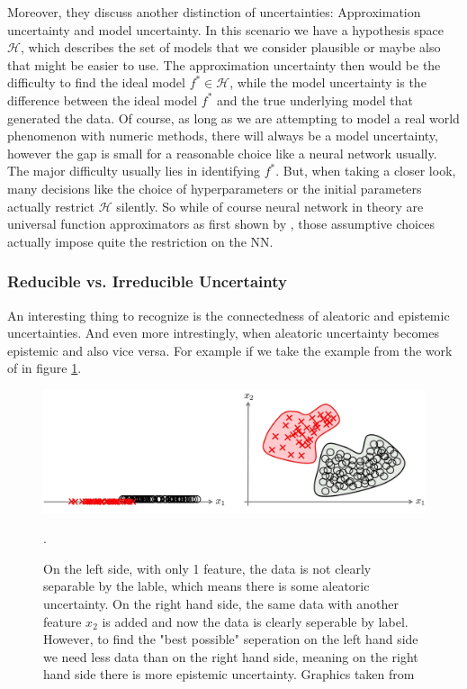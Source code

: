 \documentclass{article}
\begin{document}
Moreover, they discuss another distinction of uncertainties: Approximation uncertainty and model uncertainty. In this scenario we have a hypothesis space $\mathcal{H}$, which describes the set of models that we consider plausible or maybe also that might be easier to use. The approximation uncertainty then would be the difficulty to find the ideal model $f^* \in \mathcal{H}$, while the model uncertainty is the difference between the ideal model $f^*$ and the true underlying model that generated the data. Of course, as long as we are attempting to model a real world phenomenon with numeric methods, there will always be a model uncertainty, however the gap is small for a reasonable choice like a neural network usually. The major difficulty usually lies in identifying $f^*$. But, when taking a closer look, many decisions like the choice of hyperparameters or the initial parameters actually restrict $\mathcal{H}$ silently. So while of course neural network in theory are universal function approximators as first shown by \cite{HORNIK1989359}, those assumptive choices actually impose quite the restriction on the NN.

\subsubsection{Reducible vs. Irreducible Uncertainty}
An interesting thing to recognize is the connectedness of aleatoric and epistemic uncertainties. And even more intrestingly, when aleatoric uncertainty becomes epistemic and also vice versa. For example if we take the example from the work of \cite{hullermeier_aleatoric_2021} in figure \ref{fig:reducible_vs_irreducible}.

\begin{figure}[htbp]
  \centering
  \includegraphics[width=\textwidth]{resources/reducible_vs_irreducible.jpg}
  \caption[More features separate labels]{On the left side, with only 1 feature, the data is not clearly separable by the lable, which means there is some aleatoric uncertainty. On the right hand side, the same data with another feature $x_2$ is added and now the data is clearly seperable by label. However, to find the "best possible" seperation on the left hand side we need less data than on the right hand side, meaning on the right hand side there is more epistemic uncertainty. Graphics taken from \cite{hullermeier_aleatoric_2021}}.
  \label{fig:reducible_vs_irreducible}
\end{figure}
\end{document}
